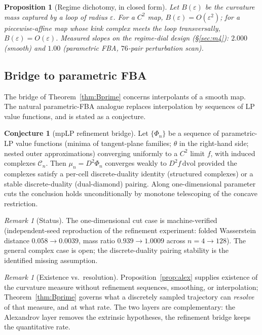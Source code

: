 \documentclass[11pt,a4paper]{article}
\theoremstyle{plain}
\newtheorem{proposition}[theorem]{Proposition}
\theoremstyle{definition}
\newtheorem{conjecture}[theorem]{Conjecture}
\theoremstyle{remark}
\newtheorem{remark}[theorem]{Remark}
\newcommand{\dvol}{\,\mathrm{dvol}}
\begin{document}
\begin{proposition}[Regime dichotomy, in closed form]
\label{prop:dichotomy}
Let $B(\varepsilon)$ be the curvature mass captured by a loop of radius
$\varepsilon$. For a $C^2$ map, $B(\varepsilon) = O(\varepsilon^2)$; for a
piecewise-affine map whose kink complex meets the loop transversally,
$B(\varepsilon) = O(\varepsilon)$. Measured slopes on the regime-dial design (\S\ref{sec:m4}): $2.000$ (smooth) and $1.00$ (parametric FBA,
$76$-pair perturbation scan).
\end{proposition}

\subsection{Bridge to parametric FBA}

The bridge of Theorem~\ref{thm:Bprime} concerns interpolants of a
smooth map. The natural parametric-FBA analogue replaces interpolation
by sequences of LP value functions, and is stated as a conjecture.

\begin{conjecture}[mpLP refinement bridge]\label{conj:bridge}
Let $\{\Phi_n\}$ be a sequence of parametric-LP value functions (minima of
tangent-plane families; $\theta$ in the right-hand side; nested outer
approximations) converging uniformly to a $C^2$ limit $f$, with induced
complexes $\mathcal{C}_n$. Then $\mu_n = D^2\Phi_n$ converges weakly to
$D^2 f \dvol$ provided the complexes satisfy a per-cell discrete-duality
identity (structured complexes) or a stable discrete-duality
(dual-diamond) pairing. Along one-dimensional parameter cuts the
conclusion holds unconditionally by monotone telescoping of the concave
restriction.
\end{conjecture}

\begin{remark}[Status]
The one-dimensional cut case is machine-verified (independent-seed
reproduction of the refinement experiment: folded Wasserstein distance
$0.058 \to 0.0039$, mass ratio $0.939 \to 1.0009$ across
$n = 4 \to 128$). The general complex case is open; the discrete-duality
pairing stability is the identified missing assumption.
\end{remark}

\begin{remark}[Existence vs.\ resolution]
Proposition~\ref{prop:alex} supplies existence of the curvature measure
without refinement sequences, smoothing, or interpolation; Theorem~\ref{thm:Bprime} governs what a discretely sampled trajectory can \emph{resolve} of that
measure, and at what rate. The two layers are complementary: the
Alexandrov layer removes the extrinsic hypotheses, the refinement
bridge keeps the quantitative rate.
\end{remark}
\end{document}
